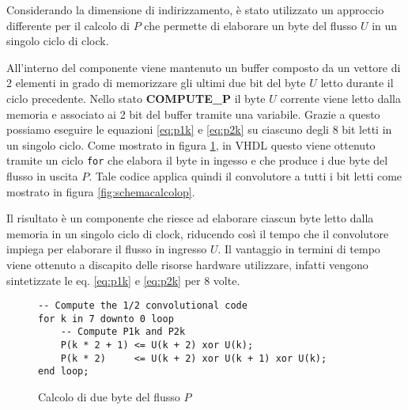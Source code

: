 Considerando la dimensione di indirizzamento, è stato utilizzato un approccio differente per il calcolo di $P$ che permette di elaborare un byte del flusso $U$ in un singolo ciclo di clock.

All'interno del componente viene mantenuto un buffer composto da un vettore di 2 elementi in grado di memorizzare gli ultimi due bit del byte $U$ letto durante il ciclo precedente. Nello stato \textbf{COMPUTE\_P} il byte $U$ corrente viene letto dalla memoria e associato ai 2 bit del buffer tramite una variabile. Grazie a questo possiamo eseguire le equazioni \ref{eq:p1k} e \ref{eq:p2k} su ciascuno degli 8 bit letti in un singolo ciclo. Come mostrato in figura \ref{code:calcolop}, in VHDL questo viene ottenuto tramite un ciclo \verb|for| che elabora il byte in ingesso e che produce i due byte del flusso in uscita $P$. Tale codice applica quindi il convolutore a tutti i bit letti come mostrato in figura \ref{fig:schemacalcolop}.

Il risultato è un componente che riesce ad elaborare ciascun byte letto dalla memoria in un singolo ciclo di clock, riducendo così il tempo che il convolutore impiega per elaborare il flusso in ingresso $U$. Il vantaggio in termini di tempo viene ottenuto a discapito delle risorse hardware utilizzare, infatti vengono sintetizzate le eq. \ref{eq:p1k} e \ref{eq:p2k} per 8 volte.

\begin{figure}[!ht]
    \centering
    \begin{varwidth}{\linewidth}
        \begin{verbatim}
-- Compute the 1/2 convolutional code
for k in 7 downto 0 loop
    -- Compute P1k and P2k
    P(k * 2 + 1) <= U(k + 2) xor U(k);
    P(k * 2)     <= U(k + 2) xor U(k + 1) xor U(k);
end loop;
    \end{verbatim}
    \end{varwidth}
    \caption{Calcolo di due byte del flusso $P$}
    \label{code:calcolop}
\end{figure}

